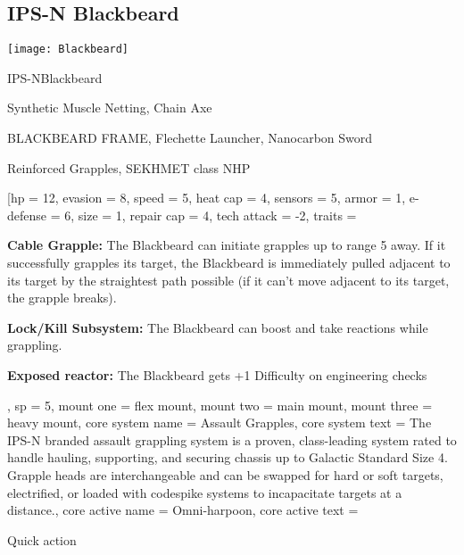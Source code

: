 \subsection{IPS-N Blackbeard}

\begin{center}
    \texttt{[image: Blackbeard]}
\end{center}

\begin{mech}{IPS-N}{Blackbeard}


\begin{license}
\item Synthetic Muscle Netting, Chain Axe
\item BLACKBEARD FRAME, Flechette Launcher, Nanocarbon Sword
\item Reinforced Grapples, SEKHMET class NHP
\end{license}

\frameBox
[hp = 12,
evasion = 8,
speed = 5,
heat cap = 4,
sensors = 5,
armor = 1,
e-defense = 6,
size = 1,
repair cap = 4,
tech attack = -2,
traits = {\textbf{Cable Grapple:} The Blackbeard can initiate grapples up to range 5 away. If it successfully grapples its target, the Blackbeard is immediately pulled adjacent to its target by the straightest path possible (if it can’t move adjacent to its target, the grapple breaks).

\textbf{Lock/Kill Subsystem:} The Blackbeard can boost and take reactions while grappling.

\textbf{Exposed reactor:} The Blackbeard gets +1 Difficulty on engineering checks},
sp = 5,
mount one = flex mount,
mount two = main mount,
mount three = heavy mount,
core system name = Assault Grapples,
core system text = {The IPS-N branded assault grappling system is a proven, class-leading system rated to handle hauling, supporting, and securing chassis up to Galactic Standard Size 4. Grapple heads are interchangeable and can be swapped for hard or soft targets, electrified, or loaded with codespike systems to incapacitate targets at a distance.},
core active name = Omni-harpoon,
core active text = {Quick action

}
\end{mech}

